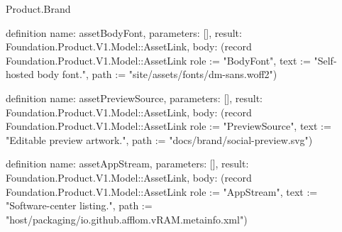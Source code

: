 \begin{lexlean}{Product.Brand}
\begin{semanticmodule}
definition{
  name: assetBodyFont, parameters: [], result: Foundation.Product.V1.Model::AssetLink,
  body: (record Foundation.Product.V1.Model::AssetLink {role := "BodyFont", text := "Self-hosted body font.", path := "site/assets/fonts/dm-sans.woff2"})
}

definition{
  name: assetPreviewSource, parameters: [], result: Foundation.Product.V1.Model::AssetLink,
  body: (record Foundation.Product.V1.Model::AssetLink {role := "PreviewSource", text := "Editable preview artwork.", path := "docs/brand/social-preview.svg"})
}

definition{
  name: assetAppStream, parameters: [], result: Foundation.Product.V1.Model::AssetLink,
  body: (record Foundation.Product.V1.Model::AssetLink {role := "AppStream", text := "Software-center listing.", path := "host/packaging/io.github.afflom.vRAM.metainfo.xml"})
}
\end{semanticmodule}
\end{lexlean}
